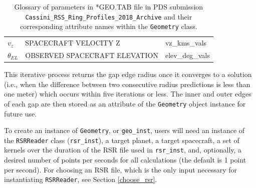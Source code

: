 \documentclass[titlepage, 12pt]{article}
\begin{document}
\begin{table}[H]
\begin{tabular}{l l l}
                    $v_z$&SPACECRAFT VELOCITY Z
                         &vz\_kms\_vals\\
                    $\theta_{EL}$&OBSERVED SPACECRAFT ELEVATION
                                 &elev\_deg\_vals \\ 
                    \hline
                \end{tabular}
                \caption[Glossary of parameters in the *GEO.TAB file]
                    {Glossary of parameters in *GEO.TAB file
                     in PDS submission
                     \texttt{Cassini\_RSS\_Ring\_Profiles\_2018\_Archive}
                     and their corresponding attribute names
                     within the \texttt{Geometry} class.}
                \label{tab:easydata_glossary_of_geo_file}
            \end{table}
            This iterative process returns the gap edge radius once it converges
            to a solution (i.e., when the difference between two consecutive
            radius predictions is less than one meter) which occurs within five
            iterations or less. The inner and outer edges of each gap are then
            stored as an attribute of the \texttt{Geometry}
            object instance for future use.
            \par\hfill\par
            To create an instance of \texttt{Geometry}, or
            \texttt{geo\_inst}, users will need an instance of
            the \texttt{RSRReader} class (\texttt{rsr\_inst}),
            a target planet, a target spacecraft, a set of kernels
            over the duration of the RSR file used in
            \texttt{rsr\_inst}, and, optionally, a desired number
            of points per seconds for all calculations
            (the default is 1 point per second). For choosing an
            RSR file, which is the only input necessary for
            instantiating \texttt{RSRReader}, see Section
            \ref{choose_rsr}.
\end{document}
